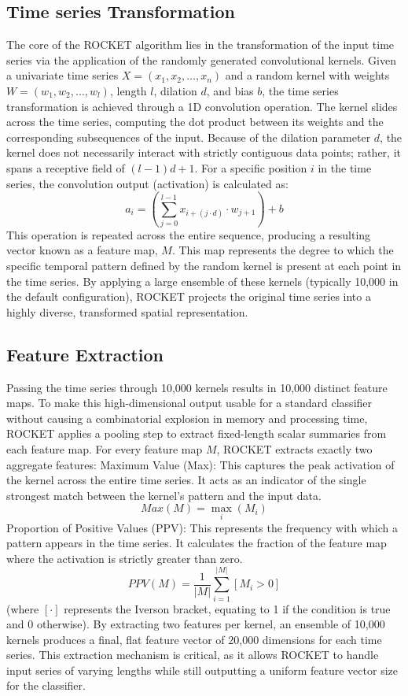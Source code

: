 \documentclass[conference]{IEEEtran}
\begin{document}
\subsection{Time series Transformation}
The core of the ROCKET algorithm lies in the transformation of the input time series via the application of the randomly generated convolutional kernels. Given a univariate time series $X = (x_1, x_2, \dots, x_n)$ and a random kernel with weights $W = (w_1, w_2, \dots, w_l)$, length $l$, dilation $d$, and bias $b$, the time series transformation is achieved through a 1D convolution operation. The kernel slides across the time series, computing the dot product between its weights and the corresponding subsequences of the input. Because of the dilation parameter $d$, the kernel does not necessarily interact with strictly contiguous data points; rather, it spans a receptive field of $(l - 1)d + 1$. For a specific position $i$ in the time series, the convolution output (activation) is calculated as:
$$a_i = \left( \sum_{j=0}^{l-1} x_{i+(j \cdot d)} \cdot w_{j+1} \right) + b$$
This operation is repeated across the entire sequence, producing a resulting vector known as a feature map, $M$. This map represents the degree to which the specific temporal pattern defined by the random kernel is present at each point in the time series. By applying a large ensemble of these kernels (typically 10,000 in the default configuration), ROCKET projects the original time series into a highly diverse, transformed spatial representation.

\subsection{Feature Extraction}
Passing the time series through 10,000 kernels results in 10,000 distinct feature maps. To make this high-dimensional output usable for a standard classifier without causing a combinatorial explosion in memory and processing time, ROCKET applies a pooling step to extract fixed-length scalar summaries from each feature map. For every feature map $M$, ROCKET extracts exactly two aggregate features: Maximum Value (Max): This captures the peak activation of the kernel across the entire time series. It acts as an indicator of the single strongest match between the kernel's pattern and the input data.
$$Max(M) = \max_i(M_i)$$
Proportion of Positive Values (PPV): This represents the frequency with which a pattern appears in the time series. It calculates the fraction of the feature map where the activation is strictly greater than zero.
$$PPV(M) = \frac{1}{|M|} \sum_{i=1}^{|M|} [M_i > 0]$$
(where $[ \cdot ]$ represents the Iverson bracket, equating to 1 if the condition is true and 0 otherwise). By extracting two features per kernel, an ensemble of 10,000 kernels produces a final, flat feature vector of 20,000 dimensions for each time series. This extraction mechanism is critical, as it allows ROCKET to handle input series of varying lengths while still outputting a uniform feature vector size for the classifier.
\end{document}
